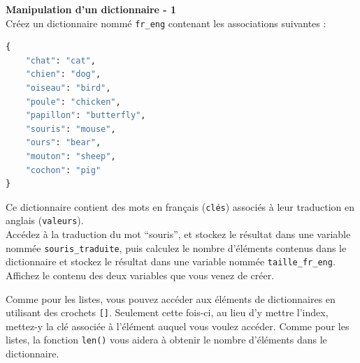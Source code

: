 	\begin{Exercice}[5 minutes] [Python] \textbf{Manipulation d'un dictionnaire - 1}\\
       Créez un dictionnaire nommé \lstinline{fr_eng} contenant les associations suivantes :
       
       \begin{lstlisting}[language=Python]
{
    "chat": "cat", 
    "chien": "dog", 
    "oiseau": "bird", 
    "poule": "chicken", 
    "papillon": "butterfly", 
    "souris": "mouse", 
    "ours": "bear", 
    "mouton": "sheep", 
    "cochon": "pig"
}
\end{lstlisting}

       Ce dictionnaire contient des mots en français (\lstinline{clés}) associés à leur traduction en anglais (\lstinline{valeurs}). \\
       
       Accédez à la traduction du mot ``souris'', et stockez le résultat dans une variable nommée \lstinline{souris_traduite}, puis calculez le nombre d'éléments contenus dans le dictionnaire et stockez le résultat dans une variable nommée \lstinline{taille_fr_eng}. Affichez le contenu des deux variables que vous venez de créer.
    
        \begin{conseil}
            Comme pour les listes, vous pouvez accéder aux éléments de dictionnaires en utilisant des crochets \lstinline{[]}. Seulement cette fois-ci, au lieu d'y mettre l'index, mettez-y la clé associée à l'élément auquel vous voulez accéder. Comme pour les listes, la fonction \lstinline{len()} vous aidera à obtenir le nombre d'éléments dans le dictionnaire.
        \end{conseil}
        
        \begin{solution}
             
        \end{solution}
    \end{Exercice}
    
